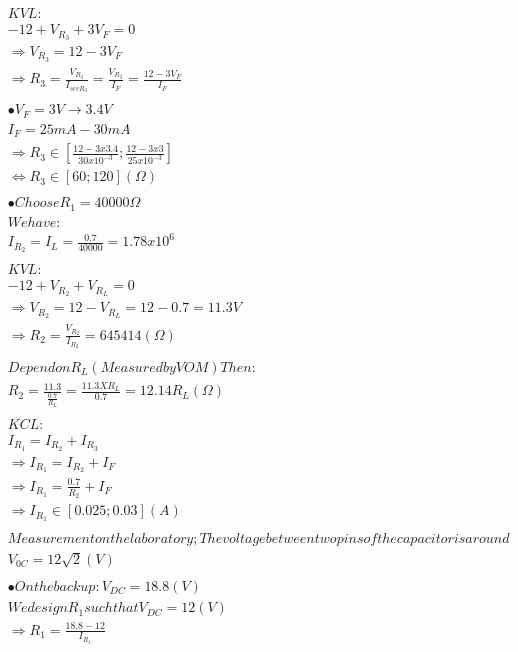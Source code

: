 \documentclass{amsart}
\begin{document}
\begin{align*}
&KVL:\\
&-12 + V_{R_3} + 3V_F = 0\\
&\Longrightarrow V_{R_3} = 12 - 3V_F\\
&\Longrightarrow R_3 = \frac{V_{R_3}}{I_{sccR_3}} = \frac{V_{R_3}}{I_F} = \frac{12 - 3V_F}{I_F}\\
\\
&\bullet V_F  = 3V \longrightarrow 3.4V\\
&I_F = 25mA - 30mA\\
&\Longrightarrow R_3 \in \left[\frac{12 - 3x3.4}{30x10^{-3}} ; \frac{12 - 3x3}{25x10^{-3}}\right]\\
&\iff R_3 \in [60 ; 120] (\Omega)\\
\\
&\bullet Choose R_1 = 40000\Omega\\
&We have:\\
&I_{R_2} = I_L = \frac{0.7}{40000} = 1.78x10^6\\
\\
&KVL:\\
&-12 + V_{R_2} + V_{R_L} = 0\\
&\Longrightarrow V_{R_2} = 12 - V_{R_L} = 12 - 0.7 = 11.3V\\
&\Longrightarrow R_2 = \frac{V_{R_2}}{I_{R_2}} = 645414 (\Omega)\\
\\
&Depend on R_L  (Measured by VOM) Then:\\
&R_2 = \frac{11.3}{\frac{0.7}{R_L}} = \frac{11.3 X R_L}{0.7} = 12.14R_L (\Omega)\\
\\
&KCL:\\
&I_{R_1} = I_{R_2} + I_{R_3}\\
&\Longrightarrow I_{R_1} = I_{R_2} + I_F\\
&\Longrightarrow I_{R_1} = \frac{0.7}{R_2} + I_F\\
&\Longrightarrow I_{R_1} \in [0.025 ; 0.03] (A)\\
\\
&Measurement on the laboratory; The voltage between two pins of the capacitor is around\\
&V_{0C} = 12\sqrt{2} (V)\\
\\
&\bullet On the backup: V_{DC} = 18.8 (V)\\
&We design R_1 such that V_{DC} = 12 (V)\\
&\Longrightarrow R_1 = \frac{18.8 - 12}{I_{R_1}}\\

\end{align*}
\end{document}
